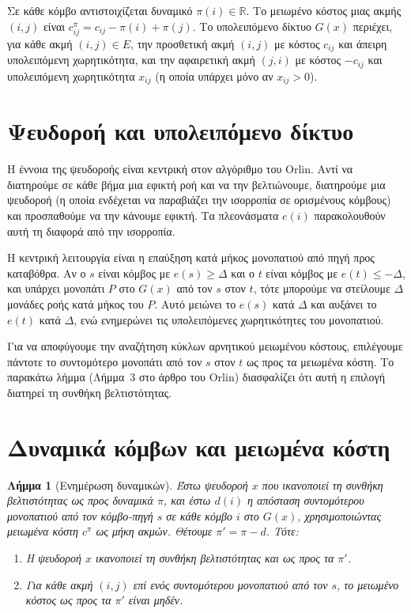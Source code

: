 \documentclass[11pt,a4paper,oneside]{report}
\newtheorem{lemma}[theorem]{Λήμμα}
\begin{document}
Σε κάθε κόμβο αντιστοιχίζεται δυναμικό $\pi(i) \in \mathbb{R}$. Το μειωμένο κόστος μιας ακμής $(i,j)$ είναι $c^{\pi}_{ij} = c_{ij} - \pi(i) + \pi(j)$. Το υπολειπόμενο δίκτυο $G(x)$ περιέχει, για κάθε ακμή $(i,j) \in E$, την προσθετική ακμή $(i,j)$ με κόστος $c_{ij}$ και άπειρη υπολειπόμενη χωρητικότητα, και την αφαιρετική ακμή $(j,i)$ με κόστος $-c_{ij}$ και υπολειπόμενη χωρητικότητα $x_{ij}$ (η οποία υπάρχει μόνο αν $x_{ij} > 0$).

\section{Ψευδοροή και υπολειπόμενο δίκτυο}

Η έννοια της ψευδοροής είναι κεντρική στον αλγόριθμο του \textenglish{Orlin}. Αντί να διατηρούμε σε κάθε βήμα μια εφικτή ροή και να την βελτιώνουμε, διατηρούμε μια ψευδοροή (η οποία ενδέχεται να παραβιάζει την ισορροπία σε ορισμένους κόμβους) και προσπαθούμε να την κάνουμε εφικτή. Τα πλεονάσματα $e(i)$ παρακολουθούν αυτή τη διαφορά από την ισορροπία.

Η κεντρική λειτουργία είναι η επαύξηση κατά μήκος μονοπατιού από πηγή προς καταβόθρα. Αν ο $s$ είναι κόμβος με $e(s) \geq \Delta$ και ο $t$ είναι κόμβος με $e(t) \leq -\Delta$, και υπάρχει μονοπάτι $P$ στο $G(x)$ από τον $s$ στον $t$, τότε μπορούμε να στείλουμε $\Delta$ μονάδες ροής κατά μήκος του $P$. Αυτό μειώνει το $e(s)$ κατά $\Delta$ και αυξάνει το $e(t)$ κατά $\Delta$, ενώ ενημερώνει τις υπολειπόμενες χωρητικότητες του μονοπατιού.

Για να αποφύγουμε την αναζήτηση κύκλων αρνητικού μειωμένου κόστους, επιλέγουμε πάντοτε το συντομότερο μονοπάτι από τον $s$ στον $t$ ως προς τα μειωμένα κόστη. Το παρακάτω λήμμα (Λήμμα~3 στο άρθρο του \textenglish{Orlin}) διασφαλίζει ότι αυτή η επιλογή διατηρεί τη συνθήκη βελτιστότητας.

\section{Δυναμικά κόμβων και μειωμένα κόστη}

\begin{lemma}[Ενημέρωση δυναμικών]
Έστω ψευδοροή $x$ που ικανοποιεί τη συνθήκη βελτιστότητας ως προς δυναμικά $\pi$, και έστω $d(i)$ η απόσταση συντομότερου μονοπατιού από τον κόμβο-πηγή $s$ σε κάθε κόμβο $i$ στο $G(x)$, χρησιμοποιώντας μειωμένα κόστη $c^{\pi}$ ως μήκη ακμών. Θέτουμε $\pi' = \pi - d$. Τότε:
\begin{enumerate}
  \item Η ψευδοροή $x$ ικανοποιεί τη συνθήκη βελτιστότητας και ως προς τα $\pi'$.
  \item Για κάθε ακμή $(i,j)$ επί ενός συντομότερου μονοπατιού από τον $s$, το μειωμένο κόστος ως προς τα $\pi'$ είναι μηδέν.
\end{enumerate}
\end{lemma}
\end{document}
